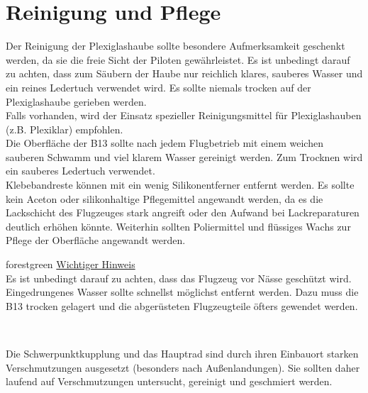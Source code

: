 \section{Reinigung und Pflege}
Der Reinigung der Plexiglashaube sollte besondere Aufmerksamkeit geschenkt werden, da sie die freie Sicht der Piloten gewährleistet. Es ist unbedingt darauf zu achten, dass zum Säubern der Haube nur reichlich klares, sauberes Wasser und ein reines Ledertuch verwendet wird. Es sollte niemals trocken auf der Plexiglashaube gerieben werden. \\
\newline
Falls vorhanden, wird der Einsatz spezieller Reinigungsmittel für Plexiglashauben (z.B. Plexiklar) empfohlen. \\
\newline
Die Oberfläche der B13 sollte nach jedem Flugbetrieb mit einem weichen sauberen Schwamm und viel klarem Wasser gereinigt werden. Zum Trocknen wird ein sauberes Ledertuch verwendet. \\
\newline
Klebebandreste können mit ein wenig Silikonentferner entfernt werden. Es sollte kein Aceton oder silikonhaltige Pflegemittel angewandt werden, da es die Lackschicht des Flugzeuges stark angreift oder den Aufwand bei Lackreparaturen deutlich erhöhen könnte. Weiterhin sollten Poliermittel und flüssiges Wachs zur Pflege der Oberfläche angewandt werden. \\
\newline
\begin{color}{forestgreen}
\large{\underline{Wichtiger Hinweis}}\\
Es ist unbedingt darauf zu achten, dass das Flugzeug vor Nässe geschützt wird. 	Eingedrungenes Wasser sollte schnellst möglichst entfernt werden. Dazu muss die B13 trocken gelagert und die abgerüsteten Flugzeugteile  öfters gewendet 	werden. 
\end{color}\\
\newline

Die Schwerpunktkupplung und das Hauptrad sind durch ihren Einbauort starken Verschmutzungen ausgesetzt (besonders nach Außenlandungen). Sie sollten daher laufend auf Verschmutzungen untersucht, gereinigt und geschmiert werden. 